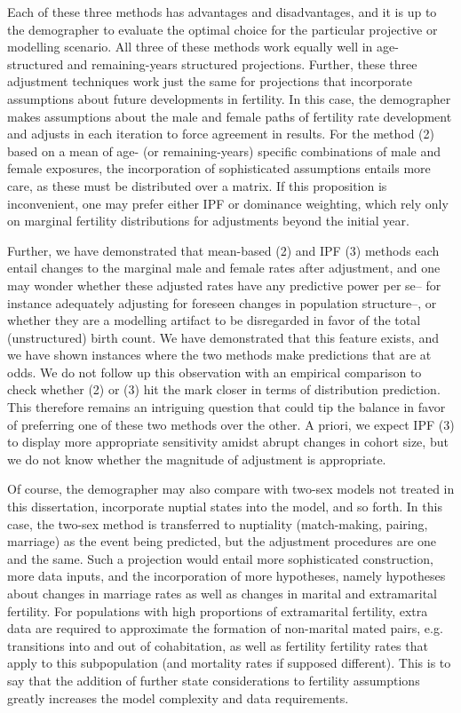 Each of these three methods has advantages and disadvantages, and it is up to
the demographer to evaluate the optimal choice for the particular projective or
modelling scenario. All three of these methods work equally well in
age-structured and remaining-years structured projections. Further, these three
adjustment techniques work just the same for projections that incorporate
assumptions about future developments in fertility. In this case, the
demographer makes assumptions about the male and female paths of fertility rate development and adjusts in each
iteration to force agreement in results. For the method (2) based on a mean of
age- (or remaining-years) specific combinations of male and female exposures,
the incorporation of sophisticated assumptions entails more care, as these must be
distributed over a matrix. If this proposition is inconvenient, one may prefer
either IPF or dominance weighting, which rely only on marginal fertility
distributions for adjustments beyond the initial year.

Further, we have demonstrated that mean-based (2) and IPF (3) methods each
entail changes to the marginal male and female rates after adjustment, and one
may wonder whether these adjusted rates have any predictive power per se-- for
instance adequately adjusting for foreseen changes in population structure--, or
whether they are a modelling artifact to be disregarded in favor of the total 
(unstructured) birth count. We have demonstrated that this feature exists,
and we have shown instances where the two methods make predictions that are at
odds. We do not follow up this observation with an empirical comparison
to check whether (2) or (3) hit the mark closer in terms of distribution
prediction. This therefore remains an intriguing question that could tip the
balance in favor of preferring one of these two methods over the other. A
priori, we expect IPF (3) to display more appropriate sensitivity amidst abrupt
changes in cohort size, but we do not know whether the magnitude of adjustment is
appropriate. 

Of course, the demographer may also compare with two-sex models not treated
in this dissertation, incorporate nuptial states into the model, and so
forth. In this case, the two-sex method is transferred to nuptiality
(match-making, pairing, marriage) as the event being predicted, but the
adjustment procedures are one and the same. Such a projection would
entail more sophisticated construction, more data inputs, and the incorporation of more hypotheses,
namely hypotheses about changes in marriage rates as well as changes in marital
and extramarital fertility. For populations with high proportions of
extramarital fertility, extra data are required to approximate the formation of
non-marital mated pairs, e.g. transitions into and out of cohabitation, as well
as fertility fertility rates that apply to this subpopulation (and mortality
rates if supposed different). This is to say that the addition of further state
considerations to fertility assumptions greatly increases the model complexity
and data requirements.

